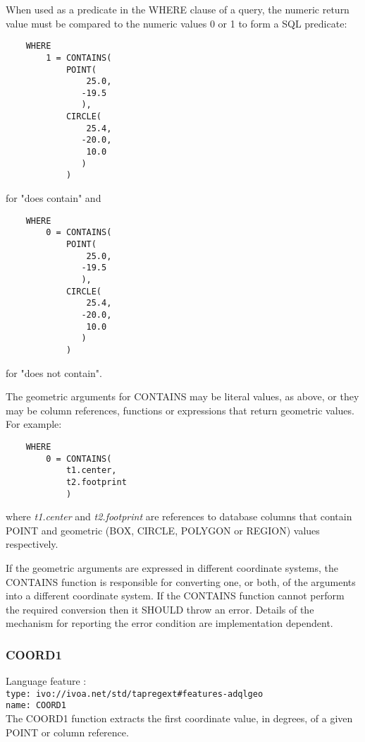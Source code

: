 \documentclass[11pt,a4paper]{ivoa}
\begin{document}
When used as a predicate in the WHERE clause of a query, the numeric return
value must be compared to the numeric values 0 or 1 to form a SQL predicate:
\begin{verbatim}
    WHERE
        1 = CONTAINS(
            POINT(
                25.0,
               -19.5
               ),
            CIRCLE(
                25.4,
               -20.0,
                10.0
               )
            )
\end{verbatim}
\noindent
for "does contain" and
\begin{verbatim}
    WHERE
        0 = CONTAINS(
            POINT(
                25.0,
               -19.5
               ),
            CIRCLE(
                25.4,
               -20.0,
                10.0
               )
            )
\end{verbatim}
\noindent
for "does not contain".


The geometric arguments for CONTAINS may be literal values, as above,
or they may be column references, functions or expressions that return
geometric values.
For example:
\begin{verbatim}
    WHERE
        0 = CONTAINS(
            t1.center,
            t2.footprint
            )
\end{verbatim}
where \textit{t1.center} and \textit{t2.footprint} are references to
database columns that contain POINT and geometric (BOX, CIRCLE, POLYGON or REGION)
values respectively.

If the geometric arguments are expressed in different coordinate systems,
the CONTAINS function is responsible for converting one, or both, of the
arguments into a different coordinate system.
If the CONTAINS function cannot perform the required conversion then
it SHOULD throw an error.
Details of the mechanism for reporting the error condition are
implementation dependent.

\subsubsection{COORD1}
\label{sec:functions.geom.coord1}
{\footnotesize Language feature :}\\
{\footnotesize \verb|type: ivo://ivoa.net/std/tapregext#features-adqlgeo|}\\
{\footnotesize \verb|name: COORD1|}\\

The COORD1 function extracts the first coordinate value, in degrees, of a given
POINT  or column reference.
\end{document}
